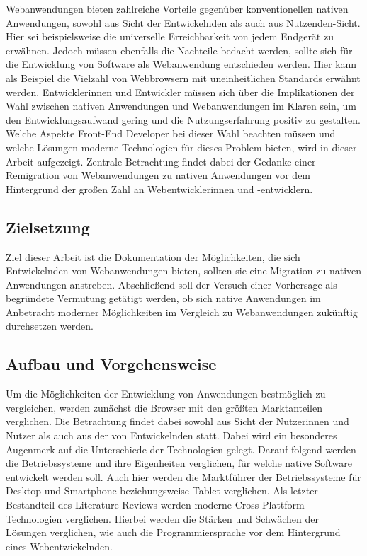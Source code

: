 \documentclass[a4paper]{scrartcl}
\begin{document}
Webanwendungen bieten zahlreiche Vorteile gegenüber konventionellen nativen Anwendungen, sowohl aus Sicht der Entwickelnden als auch aus Nutzenden-Sicht. Hier sei beispielsweise die universelle Erreichbarkeit von jedem Endgerät zu erwähnen. Jedoch müssen ebenfalls die Nachteile bedacht werden, sollte sich für die Entwicklung von Software als Webanwendung entschieden werden. Hier kann als Beispiel die Vielzahl von Webbrowsern mit uneinheitlichen Standards erwähnt werden. Entwicklerinnen und Entwickler müssen sich über die Implikationen der Wahl zwischen nativen Anwendungen und Webanwendungen im Klaren sein, um den Entwicklungsaufwand gering und die Nutzungserfahrung positiv zu gestalten. Welche Aspekte Front-End Developer bei dieser Wahl beachten müssen und welche Lösungen moderne Technologien für dieses Problem bieten, wird in dieser Arbeit aufgezeigt. Zentrale Betrachtung findet dabei der Gedanke einer Remigration von Webanwendungen zu nativen Anwendungen vor dem Hintergrund der großen Zahl an Webentwicklerinnen und -entwicklern.

\newpage

\subsection{Zielsetzung}
Ziel dieser Arbeit ist die Dokumentation der Möglichkeiten, die sich Entwickelnden von Webanwendungen bieten, sollten sie eine Migration zu nativen Anwendungen anstreben. Abschließend soll der Versuch einer Vorhersage als begründete Vermutung getätigt werden, ob sich native Anwendungen im Anbetracht moderner Möglichkeiten im Vergleich zu Webanwendungen zukünftig durchsetzen werden. 

\newpage

\subsection{Aufbau und Vorgehensweise}
Um die Möglichkeiten der Entwicklung von Anwendungen bestmöglich zu vergleichen, werden zunächst die Browser mit den größten Marktanteilen verglichen. Die Betrachtung findet dabei sowohl aus Sicht der Nutzerinnen und Nutzer als auch aus der von Entwickelnden statt. Dabei wird ein besonderes Augenmerk auf die Unterschiede der Technologien gelegt. Darauf folgend werden die Betriebssysteme und ihre Eigenheiten verglichen, für welche native Software entwickelt werden soll. Auch hier werden die Marktführer der Betriebssysteme für Desktop und Smartphone beziehungsweise Tablet verglichen. Als letzter Bestandteil des Literature Reviews werden moderne Cross-Plattform-Technologien verglichen. Hierbei werden die Stärken und Schwächen der Lösungen verglichen, wie auch die Programmiersprache vor dem Hintergrund eines Webentwickelnden. \\
\end{document}
